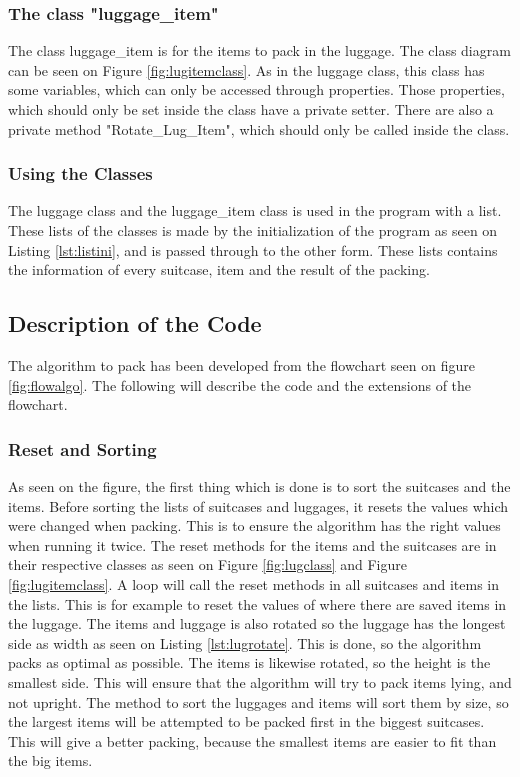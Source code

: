 \subsubsection{The class "luggage\_item"}
The class luggage\_item is for the items to pack in the luggage. The class diagram can be seen on Figure \ref{fig:lugitemclass}. As in the luggage class, this class has some variables, which can only be accessed through properties. Those properties, which should only be set inside the class have a private setter. There are also a private method "Rotate\_Lug\_Item", which should only be called inside the class.
\subsubsection{Using the Classes}
The luggage class and the luggage\_item class is used in the program with a list. These lists of the classes is made by the initialization of the program as seen on Listing \ref{lst:listini}, and is passed through to the other form. These lists contains the information of every suitcase, item and the result of the packing.
\subsection{Description of the Code}
The algorithm to pack has been developed from the flowchart seen on figure \ref{fig:flowalgo}. The following will describe the code and the extensions of the flowchart.
\subsubsection{Reset and Sorting}
As seen on the figure, the first thing which is done is to sort the suitcases and the items. Before sorting the lists of suitcases and luggages, it resets the values which were changed when packing. This is to ensure the algorithm has the right values when running it twice. The reset methods for the items and the suitcases are in their respective classes as seen on Figure \ref{fig:lugclass} and Figure \ref{fig:lugitemclass}. A loop will call the reset methods in all suitcases and items in the lists. This is for example to reset the values of where there are saved items in the luggage. The items and luggage is also rotated so the luggage has the longest side as width as seen on Listing \ref{lst:lugrotate}. This is done, so the algorithm packs as optimal as possible. The items is likewise rotated, so the height is the smallest side. This will ensure that the algorithm will try to pack items lying, and not upright.
The method to sort the luggages and items will sort them by size, so the largest items will be attempted to be packed first in the biggest suitcases. This will give a better packing, because the smallest items are easier to fit than the big items.
